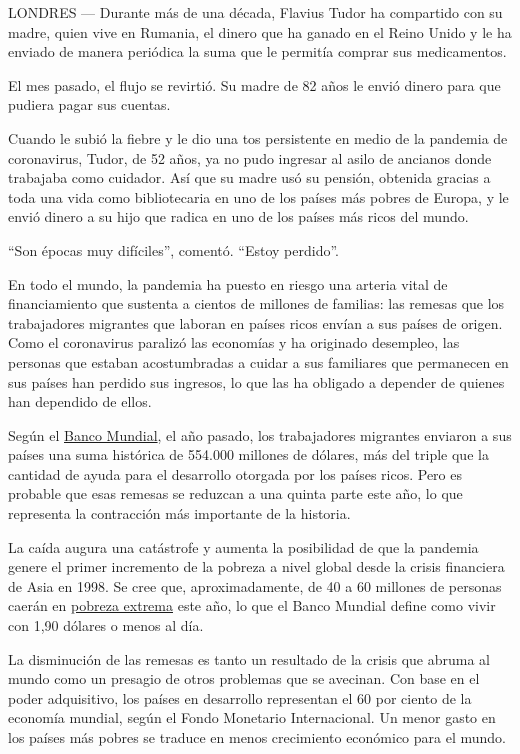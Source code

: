 LONDRES --- Durante más de una década, Flavius Tudor ha compartido con
su madre, quien vive en Rumania, el dinero que ha ganado en el Reino
Unido y le ha enviado de manera periódica la suma que le permitía
comprar sus medicamentos.

El mes pasado, el flujo se revirtió. Su madre de 82 años le envió dinero
para que pudiera pagar sus cuentas.

Cuando le subió la fiebre y le dio una tos persistente en medio de la
pandemia de coronavirus, Tudor, de 52 años, ya no pudo ingresar al asilo
de ancianos donde trabajaba como cuidador. Así que su madre usó su
pensión, obtenida gracias a toda una vida como bibliotecaria en uno de
los países más pobres de Europa, y le envió dinero a su hijo que radica
en uno de los países más ricos del mundo.

``Son épocas muy difíciles'', comentó. ``Estoy perdido''.

En todo el mundo, la pandemia ha puesto en riesgo una arteria vital de
financiamiento que sustenta a cientos de millones de familias: las
remesas que los trabajadores migrantes que laboran en países ricos
envían a sus países de origen. Como el coronavirus paralizó las
economías y ha originado desempleo, las personas que estaban
acostumbradas a cuidar a sus familiares que permanecen en sus países han
perdido sus ingresos, lo que las ha obligado a depender de quienes han
dependido de ellos.

Según el
\href{https://www.bancomundial.org/es/news/press-release/2020/04/22/world-bank-predicts-sharpest-decline-of-remittances-in-recent-history}{Banco
Mundial}, el año pasado, los trabajadores migrantes enviaron a sus
países una suma histórica de 554.000 millones de dólares, más del triple
que la cantidad de ayuda para el desarrollo otorgada por los países
ricos. Pero es probable que esas remesas se reduzcan a una quinta parte
este año, lo que representa la contracción más importante de la
historia.

La caída augura una catástrofe y aumenta la posibilidad de que la
pandemia genere el primer incremento de la pobreza a nivel global desde
la crisis financiera de Asia en 1998. Se cree que, aproximadamente, de
40 a 60 millones de personas caerán en
\href{https://www.bancomundial.org/es/topic/poverty/overview}{pobreza
extrema} este año, lo que el Banco Mundial define como vivir con 1,90
dólares o menos al día.

La disminución de las remesas es tanto un resultado de la crisis que
abruma al mundo como un presagio de otros problemas que se avecinan. Con
base en el poder adquisitivo, los países en desarrollo representan el 60
por ciento de la economía mundial, según el Fondo Monetario
Internacional. Un menor gasto en los países más pobres se traduce en
menos crecimiento económico para el mundo.

